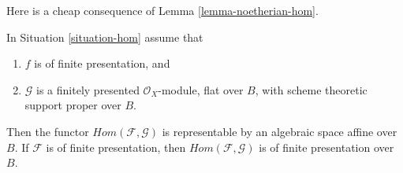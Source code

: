 \noindent
Here is a cheap consequence of Lemma \ref{lemma-noetherian-hom}.

\begin{proposition}
\label{proposition-hom}
In Situation \ref{situation-hom} assume that
\begin{enumerate}
\item $f$ is of finite presentation, and
\item $\mathcal{G}$ is a finitely presented $\mathcal{O}_X$-module,
flat over $B$, with scheme theoretic support proper over $B$.
\end{enumerate}
Then the functor $\mathit{Hom}(\mathcal{F}, \mathcal{G})$ is
representable by an algebraic space affine over $B$. If $\mathcal{F}$
is of finite presentation, then $\mathit{Hom}(\mathcal{F}, \mathcal{G})$
is of finite presentation over $B$.
\end{proposition}

